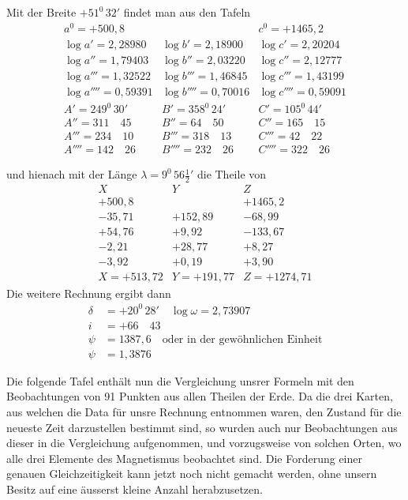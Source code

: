 Mit der Breite $+51^0\,32'$ findet man aus den Tafeln
\[
\begin{array}{r|r|r}
a^0=+500{,}8&&c^0=+1465{,}2\\
\log a'=2{,}28980&\log b'=2{,}18900&\log c'=2{,}20204\\
\log a''=1{,}79403&\log b''=2{,}03220&\log c''=2{,}12777\\
\log a'''=1{,}32522&\log b'''=1{,}46845&\log c'''=1{,}43199\\
\log a''''=0{,}59391&\log b''''=0{,}70016&\log c''''=0{,}59091\\
A'=249^0\,30'&B'=358^0\,24'&C'=105^0\,44'\\
A''=311\quad45&B''=64\quad50&C''=165\quad15\\
A'''=234\quad10&B'''=318\quad13&C'''=42\quad22\\
A''''=142\quad26&B''''=232\quad26&C''''=322\quad26
\end{array}
\]
\par\clearpage
{}
\noindent und hienach mit der Länge $\lambda=9^0\,56\frac12'$ die Theile von
\[
\begin{array}{r|r|r}
X&Y&Z\\\hline
+500{,}8&&+1465{,}2\\
-35{,}71&+152{,}89&-68{,}99\\
+54{,}76&+9{,}92&-133{,}67\\
-2{,}21&+28{,}77&+8{,}27\\
-3{,}92&+0{,}19&+3{,}90\\\hline
X=+513{,}72&Y=+191{,}77&Z=+1274{,}71
\end{array}
\]
Die weitere Rechnung ergibt dann
\[
\begin{aligned}
\delta&=+20^0\,28'\quad\log\omega=2{,}73907\\
i&=+66\quad43\\
\psi&=1387{,}6\quad\text{oder in der gewöhnlichen Einheit}\\
\psi&=1{,}3876
\end{aligned}
\]

Die folgende Tafel enthält nun die Vergleichung unsrer Formeln mit den Beobachtungen von 91 Punkten aus allen Theilen der Erde. Da die drei Karten, aus welchen die Data für unsre Rechnung entnommen waren, den Zustand für die neueste Zeit darzustellen bestimmt sind, so wurden auch nur Beobachtungen aus dieser in die Vergleichung aufgenommen, und vorzugsweise von solchen Orten, wo alle drei Elemente des Magnetismus beobachtet sind. Die Forderung einer genauen Gleichzeitigkeit kann jetzt noch nicht gemacht werden, ohne unsern Besitz auf eine äusserst kleine Anzahl herabzusetzen.

